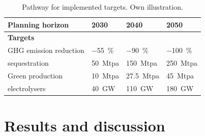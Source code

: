 \documentclass[preprint,12pt]{elsarticle}
\begin{document}
\begin{table}[htbp]
  \centering
  \caption{Pathway for implemented targets. Own illustration.}
  \label{tab:targets}
  \scriptsize
  \begin{tabularx}{\textwidth}{R{4.1cm}>{\centering\arraybackslash}X>{\centering\arraybackslash}X>{\centering\arraybackslash}X}
    \toprule
    \textbf{Planning horizon} & \textbf{2030} & \textbf{2040} & \textbf{2050} \\
    \midrule
    \textbf{Targets} & & & \\
    GHG emission reduction &  \SI{-55}{\percent} & \SI{-90}{\percent} & \SI{-100}{\percent} \\
     sequestration & \SI{50}{Mtpa} & \SI{150}{Mtpa} & \SI{250}{Mtpa} \\
    Green  production & \SI{10}{Mtpa} & \SI{27.5}{Mtpa} & \SI{45}{Mtpa} \\
     electrolysers & \SI{40}{GW} &  \SI{110}{GW} &  \SI{180}{GW} \\
    \bottomrule
  \end{tabularx}
\end{table}

\newpage
\section{Results and discussion}
\label{sec:results_and_discussion}
\end{document}
